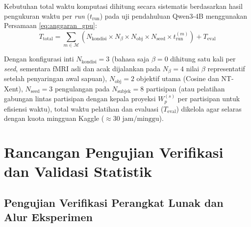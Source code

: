 Kebutuhan total waktu komputasi dihitung secara sistematis berdasarkan hasil pengukuran waktu per \textit{run} ($t_{\text{run}}$) pada uji pendahuluan Qwen3-4B menggunakan Persamaan \ref{eq:anggaran_gpu}:
\begin{equation}
  T_{\text{total}} = \sum_{m \in \mathcal{M}} \left( N_{\text{kondisi}} \times N_{\beta} \times N_{\text{obj}} \times N_{\text{seed}} \times t_{\text{run}}^{(m)} \right) + T_{\text{eval}}
  \label{eq:anggaran_gpu}
\end{equation}

Dengan konfigurasi inti $N_{\text{kondisi}} = 3$ (bahasa saja $\beta=0$ dihitung satu kali per \textit{seed}, sementara fMRI asli dan acak dijalankan pada $N_{\beta} = 4$ nilai $\beta$ representatif setelah penyaringan awal sapuan), $N_{\text{obj}} = 2$ objektif utama (Cosine dan NT-Xent), $N_{\text{seed}} = 3$ pengulangan pada $N_{\text{subjek}} = 8$ partisipan (atau pelatihan gabungan lintas partisipan dengan kepala proyeksi $W_p^{(s)}$ per partisipan untuk efisiensi waktu), total waktu pelatihan dan evaluasi ($T_{\text{eval}}$) dikelola agar selaras dengan kuota mingguan Kaggle ($\approx 30\text{ jam/minggu}$). %

\section{Rancangan Pengujian Verifikasi dan Validasi Statistik}
\label{sec:rs_pengujian}

\subsection{Pengujian Verifikasi Perangkat Lunak dan Alur Eksperimen}
\label{sub:rs_verifikasi}

